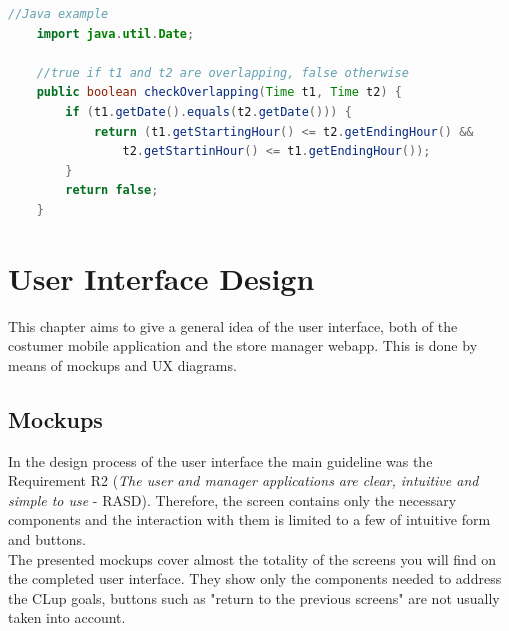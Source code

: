 \documentclass[]{article}
\begin{document}
	 \begin{lstlisting}[language=java]
	//Java example
	import java.util.Date;
	
	//true if t1 and t2 are overlapping, false otherwise	
	public boolean checkOverlapping(Time t1, Time t2) {
		if (t1.getDate().equals(t2.getDate())) {
			return (t1.getStartingHour() <= t2.getEndingHour() &&
				t2.getStartinHour() <= t1.getEndingHour());
		} 
		return false;
	}
	\end{lstlisting}
	\newpage
	\section{User Interface Design}
	This chapter aims to give a general idea of the user interface, both of the costumer mobile application and the store manager webapp. 
	This is done by means of mockups and UX diagrams.
		
		\subsection{Mockups}
		In the design process of the user interface the main guideline was the Requirement R2 (\textit{The user and manager applications are clear, intuitive and simple to use} - RASD). Therefore, the screen contains only the necessary components and the interaction with them is limited to a few of intuitive form and buttons.
		\\The presented mockups cover almost the totality of the screens you will find on the completed user interface. They show only the components needed to address the CLup goals, buttons such as "return to the previous screens" are not usually taken into account.
		
\end{document}
